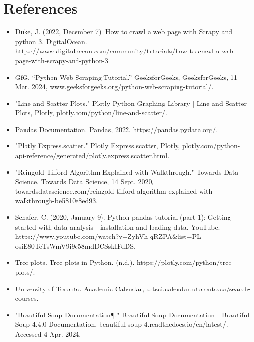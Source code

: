 \documentclass[fontsize=11pt]{article}
\begin{document}
\section*{References}
    \begin{itemize}
        \item Duke, J. (2022, December 7). How to crawl a web page with Scrapy and python 3. DigitalOcean. https://www.digitalocean.com/community/tutorials/how-to-crawl-a-web-page-with-scrapy-and-python-3

        \item GfG. “Python Web Scraping Tutorial.” GeeksforGeeks, GeeksforGeeks, 11 Mar. 2024, www.geeksforgeeks.org/python-web-scraping-tutorial/.
        
        \item "Line and Scatter Plots." Plotly Python Graphing Library | Line and Scatter Plots, Plotly, plotly.com/python/line-and-scatter/.
        
        \item Pandas Documentation. Pandas, 2022, https://pandas.pydata.org/.

        \item "Plotly Express.scatter." Plotly Express.scatter, Plotly, plotly.com/python-api-reference/generated/plotly.express.scatter.html.

        \item "Reingold-Tilford Algorithm Explained with Walkthrough." Towards Data Science, Towards Data Science, 14 Sept. 2020, towardsdatascience.com/reingold-tilford-algorithm-explained-with-walkthrough-be5810e8ed93.

        \item Schafer, C. (2020, January 9). Python pandas tutorial (part 1): Getting started with data analysis - installation and loading data. YouTube. https://www.youtube.com/watch?v=ZyhVh-qRZPA&list=PL-osiE80TeTsWmV9i9c58mdDCSskIFdDS.

        \item Tree-plots. Tree-plots in Python. (n.d.). https://plotly.com/python/tree-plots/.

        \item University of Toronto. Academic Calendar, artsci.calendar.utoronto.ca/search-courses.

        \item "Beautiful Soup Documentation¶." Beautiful Soup Documentation - Beautiful Soup 4.4.0 Documentation, beautiful-soup-4.readthedocs.io/en/latest/. Accessed 4 Apr. 2024.
    \end{itemize}


\end{document}
